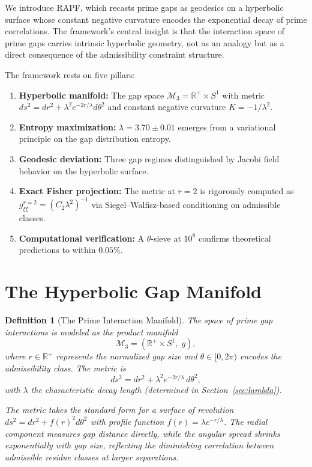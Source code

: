 \documentclass[12pt]{article}
\newtheorem{definition}[theorem]{Definition}
\begin{document}
We introduce RAPF, which recasts prime gaps as geodesics on a hyperbolic surface
whose constant negative curvature encodes the exponential decay of prime
correlations. The framework's central insight is that the interaction space of
prime gaps carries intrinsic hyperbolic geometry, not as an analogy but as a
direct consequence of the admissibility constraint structure.

The framework rests on five pillars:

\begin{enumerate}
  \item \textbf{Hyperbolic manifold:} The gap space $\mathcal{M}_3 = \mathbb{R}^+ \times S^1$
    with metric $ds^2 = dr^2 + \lambda^2 e^{-2r/\lambda} d\theta^2$ and constant
    negative curvature $K = -1/\lambda^2$.
  \item \textbf{Entropy maximization:} $\lambda = 3.70 \pm 0.01$ emerges from a
    variational principle on the gap distribution entropy.
  \item \textbf{Geodesic deviation:} Three gap regimes distinguished by Jacobi
    field behavior on the hyperbolic surface.
  \item \textbf{Exact Fisher projection:} The metric at $r=2$ is rigorously computed as
    $g_{\xi\xi}^{r=2} = (C_2 \lambda^2)^{-1}$ via Siegel--Walfisz-based conditioning
    on admissible classes.
  \item \textbf{Computational verification:} A $\theta$-sieve at $10^8$ confirms
    theoretical predictions to within $0.05\%$.
\end{enumerate}

\section{The Hyperbolic Gap Manifold}

\begin{definition}[The Prime Interaction Manifold]
The space of prime gap interactions is modeled as the product manifold
\[
  \mathcal{M}_3 = \left(\mathbb{R}^+ \times S^1,\; g\right),
\]
where $r \in \mathbb{R}^+$ represents the normalized gap size and
$\theta \in [0, 2\pi)$ encodes the admissibility class. The metric is
\begin{equation}
  ds^2 = dr^2 + \lambda^2 e^{-2r/\lambda}\, d\theta^2,
  \label{eq:metric}
\end{equation}
with $\lambda$ the characteristic decay length (determined in
Section~\ref{sec:lambda}).

The metric takes the standard form for a surface of revolution $ds^2 = dr^2 + f(r)^2 d\theta^2$
with profile function $f(r) = \lambda e^{-r/\lambda}$. The radial component measures
gap distance directly, while the angular spread shrinks exponentially with gap size,
reflecting the diminishing correlation between admissible residue classes at larger
separations.
\end{definition}
\end{document}
